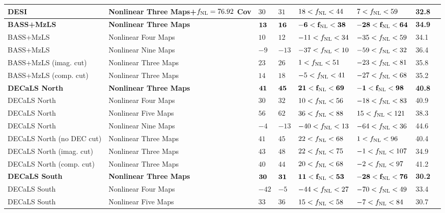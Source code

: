 \begin{table*}
{\begin{tabular}{llllllll}
DESI                     & Nonlinear Three Maps+$f_{\rm NL}=76.92$ Cov& $    30$& $    31$& $    18<f_{\rm NL}<    44$& $     7<f_{\rm NL}<    59$ &   32.8\\
\hline
\bf{BASS+MzLS}                 & \bf{Nonlinear Three Maps}& $    \bf{13}$& $    \bf{16}$& $    \bf{-6<f_{\rm NL}<    38}$& $   \bf{-28<f_{\rm NL}<64}$ &   \bf{34.9}\\
BASS+MzLS                 & Nonlinear Four Maps& $    10$& $    12$& $   -11<f_{\rm NL}<    34$& $   -35<f_{\rm NL}<    59$ &   34.1\\
BASS+MzLS                 & Nonlinear Nine Maps& $    -9$& $   -13$& $   -37<f_{\rm NL}<    10$& $   -59<f_{\rm NL}<    32$ &   36.4\\
BASS+MzLS (imag. cut)     & Nonlinear Three Maps& $    23$& $    26$& $     1<f_{\rm NL}<    51$& $   -23<f_{\rm NL}<    81$ &   35.8\\
BASS+MzLS (comp. cut)     & Nonlinear Three Maps& $    14$& $    18$& $    -5<f_{\rm NL}<    41$& $   -27<f_{\rm NL}<    68$ &   35.2\\
\hline
\bf{DECaLS North}              & \bf{Nonlinear Three Maps}& $    \bf{41}$& $    \bf{45}$& $    \bf{21<f_{\rm NL}<    69}$& $    \bf{-1<f_{\rm NL}<    98}$ &   \bf{40.8}\\
DECaLS North              & Nonlinear Four Maps& $    30$& $    32$& $    10<f_{\rm NL}<    56$& $   -18<f_{\rm NL}<    83$ &   40.9\\
DECaLS North              & Nonlinear Five Maps& $    56$& $    62$& $    36<f_{\rm NL}<    88$& $    15<f_{\rm NL}<   121$ &   38.3\\
DECaLS North              & Nonlinear Nine Maps& $    -4$& $   -13$& $   -40<f_{\rm NL}<    13$& $   -64<f_{\rm NL}<    36$ &   44.6\\
DECaLS North (no DEC cut) & Nonlinear Three Maps& $    41$& $    45$& $    22<f_{\rm NL}<    68$& $     1<f_{\rm NL}<    96$ &   40.4\\
DECaLS North (imag. cut)  & Nonlinear Three Maps& $    43$& $    48$& $    22<f_{\rm NL}<    75$& $    -1<f_{\rm NL}<   107$ &   34.9\\
DECaLS North (comp. cut)  & Nonlinear Three Maps& $    40$& $    44$& $    20<f_{\rm NL}<    68$& $    -2<f_{\rm NL}<    97$ &   41.2\\
\hline
\bf{DECaLS South}              & \bf{Nonlinear Three Maps}& $    \bf{30}$& $    \bf{31}$& $    \bf{11<f_{\rm NL}<    53}$& $   \bf{-28<f_{\rm NL}<    76}$ &   \bf{30.2}\\
DECaLS South              & Nonlinear Four Maps& $   -42$& $    -5$& $   -44<f_{\rm NL}<    27$& $   -70<f_{\rm NL}<    49$ &   33.4\\
DECaLS South              & Nonlinear Five Maps& $    33$& $    36$& $    15<f_{\rm NL}<    58$& $    -7<f_{\rm NL}<    84$ &   30.7\\

\end{tabular}}
\end{table*}
